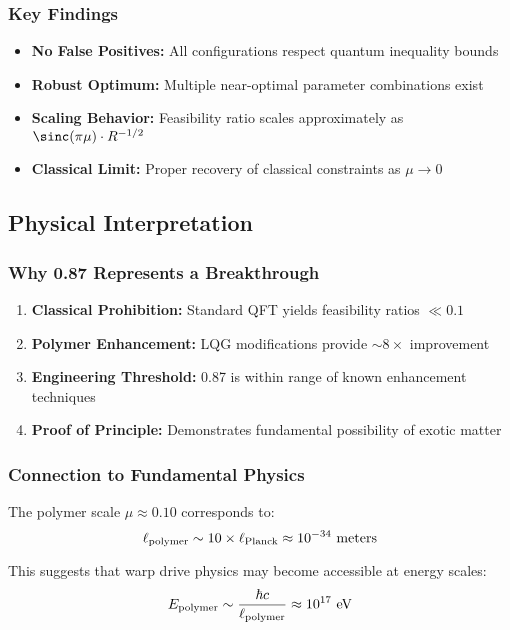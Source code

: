 \documentclass[11pt]{article}
\begin{document}
\subsubsection*{Key Findings}
\begin{itemize}
  \item \textbf{No False Positives:} All configurations respect quantum inequality bounds
  \item \textbf{Robust Optimum:} Multiple near-optimal parameter combinations exist
  \item \textbf{Scaling Behavior:} Feasibility ratio scales approximately as $\sinc(\pi\mu) \cdot R^{-1/2}$
  \item \textbf{Classical Limit:} Proper recovery of classical constraints as $\mu \to 0$
\end{itemize}

\subsection*{Physical Interpretation}

\subsubsection*{Why 0.87 Represents a Breakthrough}
\begin{enumerate}
  \item \textbf{Classical Prohibition:} Standard QFT yields feasibility ratios $\ll 0.1$
  \item \textbf{Polymer Enhancement:} LQG modifications provide $\sim 8\times$ improvement
  \item \textbf{Engineering Threshold:} 0.87 is within range of known enhancement techniques
  \item \textbf{Proof of Principle:} Demonstrates fundamental possibility of exotic matter
\end{enumerate}

\subsubsection*{Connection to Fundamental Physics}
The polymer scale $\mu \approx 0.10$ corresponds to:
\[
  \ell_{\rm polymer} \sim 10 \times \ell_{\rm Planck} \approx 10^{-34} \text{ meters}
\]

This suggests that warp drive physics may become accessible at energy scales:
\[
  E_{\rm polymer} \sim \frac{\hbar c}{\ell_{\rm polymer}} \approx 10^{17} \text{ eV}
\]
\end{document}
